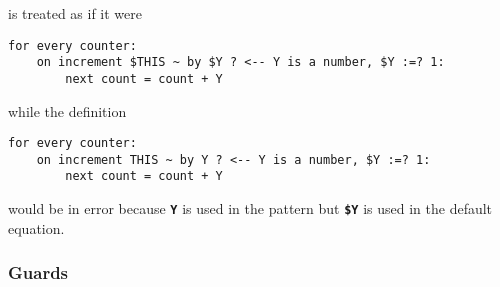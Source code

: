 \documentclass[12pt]{article}
\newcommand{\TT}[1]{{\tt \bfseries #1}}
\newenvironment{indpar}[1][0.3in]%
	{\begin{list}{}%
		     {\setlength{\itemsep}{0in}%
		      \setlength{\topsep}{0in}%
		      \setlength{\parsep}{1ex}%
		      \setlength{\labelwidth}{#1}%
		      \setlength{\leftmargin}{#1}%
		      \addtolength{\leftmargin}{\labelsep}}%
	 \item}%
	{\end{list}}
\begin{document}
is treated as if it were

\begin{indpar}\begin{verbatim}
for every counter:
    on increment $THIS ~ by $Y ? <-- Y is a number, $Y :=? 1:
        next count = count + Y
\end{verbatim}\end{indpar}

while the definition

\begin{indpar}\begin{verbatim}
for every counter:
    on increment THIS ~ by Y ? <-- Y is a number, $Y :=? 1:
        next count = count + Y
\end{verbatim}\end{indpar}

would be in error because \TT{Y} is used in the pattern but
\TT{\$Y} is used in the default equation.

\subsubsection{Guards}
\label{GUARDS}
\end{document}
